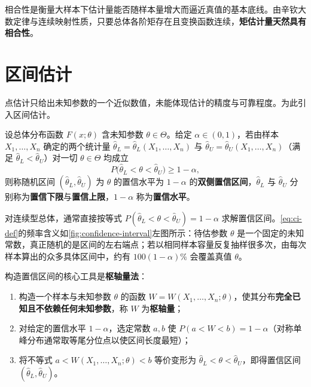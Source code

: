 相合性是衡量大样本下估计量能否随样本量增大而逼近真值的基本底线。由辛钦大数定律与连续映射性质，只要总体各阶矩存在且变换函数连续，\textbf{矩估计量天然具有相合性}。

\section{区间估计}
\label{sec:interval-estimation}

点估计只给出未知参数的一个近似数值，未能体现估计的精度与可靠程度。为此引入区间估计。

\begin{definition}[置信区间与置信水平]
\label{def:confidence-interval}
设总体分布函数 $F(x;\theta)$ 含未知参数 $\theta\in\Theta$。给定 $\alpha\in(0,1)$，若由样本 $X_1,\ldots,X_n$ 确定的两个统计量 $\hat{\theta}_L=\hat{\theta}_L(X_1,\ldots,X_n)$ 与 $\hat{\theta}_U=\hat{\theta}_U(X_1,\ldots,X_n)$（满足 $\hat{\theta}_L<\hat{\theta}_U$）对一切 $\theta\in\Theta$ 均成立
\begin{equation}
  P\bigl(\hat{\theta}_L<\theta<\hat{\theta}_U\bigr)\ge 1-\alpha,
  \label{eq:ci-def}
\end{equation}
则称随机区间 $(\hat{\theta}_L,\hat{\theta}_U)$ 为 $\theta$ 的置信水平为 $1-\alpha$ 的\textbf{双侧置信区间}，$\hat{\theta}_L$ 与 $\hat{\theta}_U$ 分别称为\textbf{置信下限}与\textbf{置信上限}，$1-\alpha$ 称为\textbf{置信水平}。
\end{definition}

对连续型总体，通常直接按等式 $P(\hat{\theta}_L<\theta<\hat{\theta}_U)=1-\alpha$ 求解置信区间。\eqref{eq:ci-def}的频率含义如\cref{fig:confidence-interval}左图所示：待估参数 $\theta$ 是一个固定的未知常数，真正随机的是区间的左右端点；若以相同样本容量反复抽样很多次，由每次样本算出的众多具体区间中，约有 $100(1-\alpha)\%$ 会覆盖真值 $\theta$。


构造置信区间的核心工具是\textbf{枢轴量法}：
\begin{enumerate}
  \item 构造一个样本与未知参数 $\theta$ 的函数 $W=W(X_1,\ldots,X_n;\theta)$，使其分布\textbf{完全已知且不依赖任何未知参数}，称 $W$ 为\textbf{枢轴量}；
  \item 对给定的置信水平 $1-\alpha$，选定常数 $a,b$ 使 $P(a<W<b)=1-\alpha$（对称单峰分布通常取等尾分位点以使区间长度最短）；
  \item 将不等式 $a<W(X_1,\ldots,X_n;\theta)<b$ 等价变形为 $\hat{\theta}_L<\theta<\hat{\theta}_U$，即得置信区间 $(\hat{\theta}_L,\hat{\theta}_U)$。
\end{enumerate}


